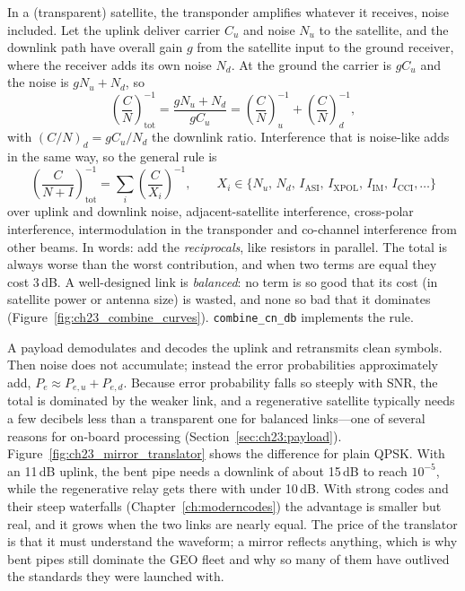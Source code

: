 In a  (transparent) satellite, the transponder amplifies whatever it receives,
noise included. Let the uplink deliver carrier $C_u$ and noise $N_u$ to the satellite, and the
downlink path have overall gain $g$ from the satellite input to the ground receiver, where the
receiver adds its own noise $N_d$. At the ground the carrier is $gC_u$ and the noise is
$gN_u+N_d$, so
\begin{equation}
\left(\frac{C}{N}\right)_{\text{tot}}^{-1}=\frac{gN_u+N_d}{gC_u}=
\left(\frac{C}{N}\right)_{u}^{-1}+\left(\frac{C}{N}\right)_{d}^{-1},
\end{equation}
with $(C/N)_d=gC_u/N_d$ the downlink ratio. Interference that is noise-like adds in the same
way, so the general rule is
\begin{equation}
\left(\frac{C}{N+I}\right)_{\text{tot}}^{-1}=\sum_i\left(\frac{C}{X_i}\right)^{-1},
\qquad X_i\in\{N_u,\,N_d,\,I_{\text{ASI}},\,I_{\text{XPOL}},\,I_{\text{IM}},\,I_{\text{CCI}},\dots\}
\label{eq:ch23:combine}
\end{equation}
over uplink and downlink noise, adjacent-satellite interference, cross-polar interference,
intermodulation in the transponder and co-channel interference from other beams. In words: add
the \emph{reciprocals}, like resistors in parallel. The total is always worse than the worst
contribution, and when two terms are equal they cost 3\,dB. A well-designed link is
\emph{balanced}: no term is so good that its cost (in satellite power or antenna size) is wasted,
and none so bad that it dominates (Figure~\ref{fig:ch23_combine_curves}).
\texttt{combine\_cn\_db} implements the rule.



A  payload demodulates and decodes the uplink and retransmits clean symbols.
Then noise does not accumulate; instead the error probabilities approximately add,
$P_e\approx P_{e,u}+P_{e,d}$. Because error probability falls so steeply with SNR, the total is
dominated by the weaker link, and a regenerative satellite typically needs a few decibels less
than a transparent one for balanced links---one of several reasons for on-board processing
(Section~\ref{sec:ch23:payload}). Figure~\ref{fig:ch23_mirror_translator} shows the difference for
plain QPSK. With an 11\,dB uplink, the bent pipe needs a downlink of about 15\,dB to reach
$10^{-5}$, while the regenerative relay gets there with under 10\,dB. With strong codes and their
steep waterfalls (Chapter~\ref{ch:moderncodes}) the advantage is smaller but real, and it grows
when the two links are nearly equal. The price of the translator is that it must understand the
waveform; a mirror reflects anything, which is why bent pipes still dominate the GEO fleet and why
so many of them have outlived the standards they were launched with.

